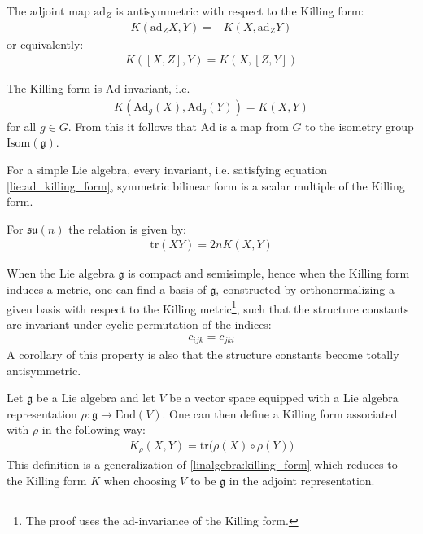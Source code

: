 	\begin{property}
		The adjoint map $\text{ad}_Z$ is antisymmetric with respect to the Killing form:
		\begin{gather}
			\label{lie:ad_killing_form}
			K(\text{ad}_ZX, Y) = -K(X, \text{ad}_ZY)
		\end{gather}
		or equivalently:
		\begin{gather}
			K([X, Z], Y) = K(X, [Z, Y])
		\end{gather}
	\end{property}
	\begin{property}
		The Killing-form is $\text{Ad}$-invariant, i.e.
                \begin{gather}
                    K(\text{Ad}_g(X), \text{Ad}_g(Y)) = K(X, Y)
		\end{gather}
                for all $g\in G$. From this it follows that $\text{Ad}$ is a map from $G$ to the isometry group $\text{Isom}(\mathfrak{g})$.
	\end{property}
	
	\begin{property}\label{lie:killing_trace}
		For a simple Lie algebra, every invariant, i.e. satisfying equation \ref{lie:ad_killing_form}, symmetric bilinear form is a scalar multiple of the Killing form.
	\end{property}
	\begin{example}
		For $\mathfrak{su}(n)$ the relation is given by:
		\begin{gather}
			\text{tr}(XY) = 2nK(X, Y)
		\end{gather}
	\end{example}
	
	\begin{property}
		When the Lie algebra $\mathfrak{g}$ is compact and semisimple, hence when the Killing form induces a metric, one can find a basis of $\mathfrak{g}$, constructed by orthonormalizing a given basis with respect to the Killing metric\footnote{The proof uses the ad-invariance of the Killing form.}, such that the structure constants are invariant under cyclic permutation of the indices:
		\begin{gather}
			c_{ijk} = c_{jki}
		\end{gather}
		A corollary of this property is also that the structure constants become totally antisymmetric.
	\end{property}
	
	\begin{construct}
		Let $\mathfrak{g}$ be a Lie algebra and let $V$ be a vector space equipped with a Lie algebra representation $\rho:\mathfrak{g}\rightarrow\text{End}(V)$. One can then define a Killing form associated with $\rho$ in the following way:
		\begin{gather}
			\label{lie:rho_killing_form}
			K_\rho(X, Y) = \text{tr}\Big(\rho(X)\circ\rho(Y)\Big)
		\end{gather}
		This definition is a generalization of \ref{linalgebra:killing_form} which reduces to the Killing form $K$ when choosing $V$ to be $\mathfrak{g}$ in the adjoint representation.
	\end{construct}

